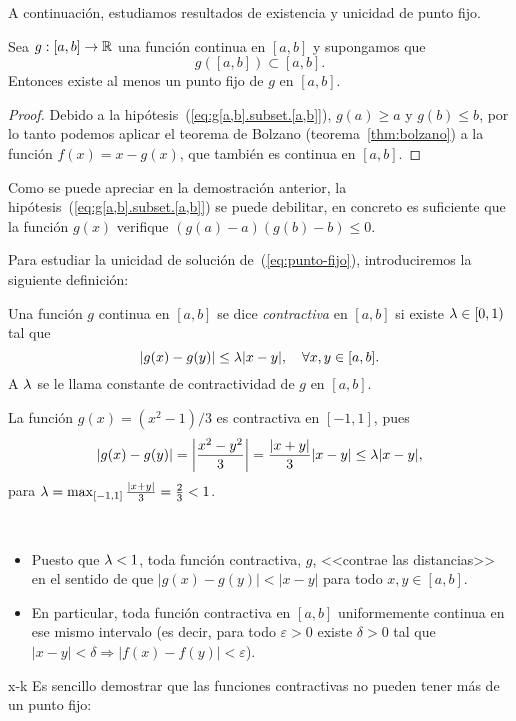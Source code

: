 A continuación, estudiamos resultados de existencia y unicidad de
punto fijo.

\begin{proposition}
  \label{pro:existencia-punto-fijo}
  Sea $g:[a,b]\to\operatorname{{\mathbb R}}$ una función continua en $[a,b]$ y supongamos
  que
  \begin{equation}
  g([a,b])\subset [a,b].
  \label{eq:g[a,b].subset.[a,b]}  
\end{equation}
  Entonces existe al menos un punto fijo de $g$ en $[a,b]$.
\end{proposition}

\begin{proof}
  Debido a la hipótesis~(\ref{eq:g[a,b].subset.[a,b]}), $g(a)\ge a$ y
  $g(b)\le b$, por lo tanto podemos aplicar el teorema de Bolzano
  (teorema~\ref{thm:bolzano}) a la función $f(x)=x-g(x)$, que también
  es continua en $[a,b]$.
\end{proof}

\begin{remark}
  Como se puede apreciar en la demostración anterior, la
  hipótesis~(\ref{eq:g[a,b].subset.[a,b]}) se puede debilitar, en
  concreto es suficiente que la función $g(x)$ verifique
  $(g(a)-a)(g(b)-b)\le 0$.
\end{remark}

Para estudiar la unicidad de solución de~(\ref{eq:punto-fijo}),
introduciremos la siguiente definición:

\begin{definition}
  Una función $g$ continua en $[a,b]$ se dice \textit{contractiva} en
  $[a,b]$ si existe $\lambda\in[0,1)$ tal que
  \begin{equation*}
    |g(x)-g(y)| \le \lambda |x-y|, \quad \forall x,y \in [a,b].
  \end{equation*}
  A $\lambda$ se le llama constante de contractividad de $g$ en $[a,b]$.
  \label{def:funcion.contractiva}
\end{definition}

\begin{example}
La función $g(x)=(x^2-1)/3$ es contractiva en $[-1,1]$, pues
$$
|g(x)-g(y)|=\left|\frac{x^2-y^2}{3}\right| = \frac{|x+y|}{3}|x-y| \le
\lambda |x-y|,
$$
para $\lambda=\max_{[-1,1]}\frac{|x+y|}{3}=\frac23 <1$.
\end{example}

\begin{remark}~
  \begin{itemize}
  \item Puesto que $\lambda<1$, toda función contractiva, $g$, <<contrae las
    distancias>> en el sentido de que $|g(x)-g(y)|<|x-y|$ para todo
    $x,y\in [a,b]$.
  \item En particular, toda función contractiva en $[a,b]$
    uniformemente continua en ese mismo intervalo (es decir, para
    todo $\varepsilon>0$ existe $\delta>0$ tal que $|x-y|<\delta
    \Rightarrow |f(x)-f(y)|<\varepsilon$).
  \end{itemize}
\end{remark}
x-k
Es sencillo demostrar que las funciones contractivas no pueden tener
más de un punto fijo:

